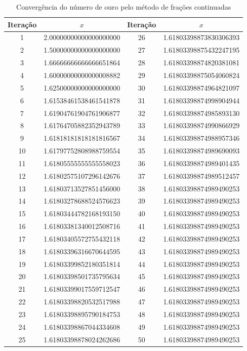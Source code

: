 \documentclass[a4paper]{article}
\begin{document}
\begin{table}[H]
	\centering
	\begin{tabular}{|c|c|c|c|}

		\hline
		Iteração & $x$ & Iteração & $x$ \\
		\hline
		1 & 2.00000000000000000000 & 26 & 1.61803398873830306393 \\
		\hline
		2 & 1.50000000000000000000 & 27 & 1.61803398875432247195 \\
		\hline
		3 & 1.66666666666666651864 & 28 & 1.61803398874820381081 \\
		\hline
		4 & 1.60000000000000008882 & 29 & 1.61803398875054060824 \\
		\hline
		5 & 1.62500000000000000000 & 30 & 1.61803398874964821097 \\
		\hline
		6 & 1.61538461538461541878 & 31 & 1.61803398874998904944 \\
		\hline
		7 & 1.61904761904761906877 & 32 & 1.61803398874985893130 \\
		\hline
		8 & 1.61764705882352943789 & 33 & 1.61803398874990866929 \\
		\hline
		9 & 1.61818181818181816567 & 34 & 1.61803398874988957346 \\
		\hline
		10 & 1.61797752808988759554 & 35 & 1.61803398874989690093 \\
		\hline
		11 & 1.61805555555555558023 & 36 & 1.61803398874989401435 \\
		\hline
		12 & 1.61802575107296142676 & 37 & 1.61803398874989512457 \\
		\hline
		13 & 1.61803713527851456000 & 38 & 1.61803398874989490253 \\
		\hline
		14 & 1.61803278688524576623 & 39 & 1.61803398874989490253 \\
		\hline
		15 & 1.61803444782168193150 & 40 & 1.61803398874989490253 \\
		\hline
		16 & 1.61803381340012508716 & 41 & 1.61803398874989490253 \\
		\hline
		17 & 1.61803405572755432118 & 42 & 1.61803398874989490253 \\
		\hline
		18 & 1.61803396316670644595 & 43 & 1.61803398874989490253 \\
		\hline
		19 & 1.61803399852180351814 & 44 & 1.61803398874989490253 \\
		\hline
		20 & 1.61803398501735795634 & 45 & 1.61803398874989490253 \\
		\hline
		21 & 1.61803399017559712547 & 46 & 1.61803398874989490253 \\
		\hline
		22 & 1.61803398820532517988 & 47 & 1.61803398874989490253 \\
		\hline
		23 & 1.61803398895790184753 & 48 & 1.61803398874989490253 \\
		\hline
		24 & 1.61803398867044334608 & 49 & 1.61803398874989490253 \\
		\hline
		25 & 1.61803398878024262686 & 50 & 1.61803398874989490253 \\
		\hline

	\end{tabular}
	\label{golden_fraction}
	\caption{Convergência do número de ouro pelo método de frações continuadas}
\end{table}
\end{document}
